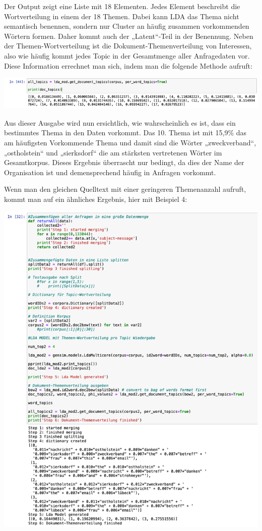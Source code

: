 \documentclass[german,version-2020-11]{uzl-thesis}
\begin{document}
Der Output zeigt eine Liste mit 18 Elementen. Jedes Element beschreibt die Wortverteilung in einem der 18 Themen. Dabei kann LDA das Thema nicht semantisch benennen, sondern nur Cluster an häufig zusammen vorkommenden Wörtern formen. Daher kommt auch der „Latent“-Teil in der Benennung. Neben der Themen-Wortverteilung ist die Dokument-Themenverteilung von Interessen, also wie häufig kommt jedes Topic in der Gesamtmenge aller Anfragedaten vor. Diese Information errechnet man sich, indem man die folgende Methode aufruft:

\includegraphics[scale=0.5]{lda3.png}

Aus dieser Ausgabe wird nun ersichtlich, wie wahrscheinlich es ist, dass ein bestimmtes Thema in den Daten vorkommt. Das 10. Thema ist mit 15,9\% das am häufigsten Vorkommende Thema und damit sind die Wörter „zweckverband“, „ostholstein“ und „sierksdorf“ die am stärksten vertretenen Wörter im Gesamtkorpus. Dieses Ergebnis überrascht nur bedingt, da dies der Name der Organisation ist und demensprechend häufig in Anfragen vorkommt. 

Wenn man den gleichen Quelltext mit einer geringeren Themenanzahl aufruft, kommt man auf ein ähnliches Ergebnis, hier mit Beispiel 4: 

\includegraphics[scale=0.5]{lda4.png}
\end{document}
